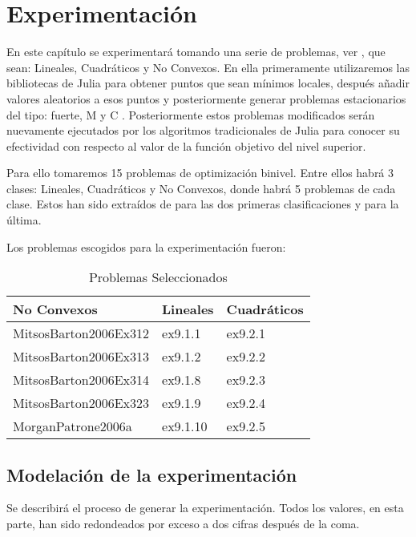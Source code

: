 
\chapter{Experimentación}
En este capítulo se experimentará tomando una serie de problemas, ver \cite{BolibTestProblems}, 
que sean: Lineales, Cuadráticos y No Convexos. En ella primeramente utilizaremos las bibliotecas de Julia
para obtener puntos que sean mínimos locales, después añadir valores aleatorios a esos puntos y posteriormente 
generar problemas estacionarios del tipo: fuerte, M y C . Posteriormente estos problemas modificados serán nuevamente
ejecutados por los algoritmos tradicionales de Julia para conocer su efectividad con respecto al valor de la función objetivo del nivel superior.


Para ello tomaremos 15 problemas de optimización binivel.
Entre ellos habrá 3 clases: Lineales, Cuadráticos y No Convexos, donde habrá 5 problemas de cada clase.
Estos han sido extraídos de \cite{Floudas1999HandbookOT} para las dos primeras clasificaciones y \cite{BolibTestProblems} para la última.


Los problemas escogidos para la experimentación fueron:

\begin{table}[h!]
\centering
\caption{Problemas Seleccionados}
\begin{tabular}{ | m{5cm} | m{5cm} | m{5cm} | }
  
  \hline
  \textbf{No Convexos} & \textbf{Lineales} & \textbf{Cuadráticos} \\
  \hline
  MitsosBarton2006Ex312 & ex9.1.1 & ex9.2.1 \\
  \hline
  MitsosBarton2006Ex313 & ex9.1.2 & ex9.2.2 \\
  \hline
  MitsosBarton2006Ex314 & ex9.1.8 & ex9.2.3\\
  \hline
  MitsosBarton2006Ex323 & ex9.1.9 & ex9.2.4\\
  \hline
  MorganPatrone2006a & ex9.1.10 & ex9.2.5 \\
  \hline
\end{tabular}
\end{table}




\section{Modelación de la experimentación}
Se describirá el proceso de generar la experimentación. 
Todos los valores, en esta parte, han sido redondeados por exceso a dos cifras después de la coma. 

